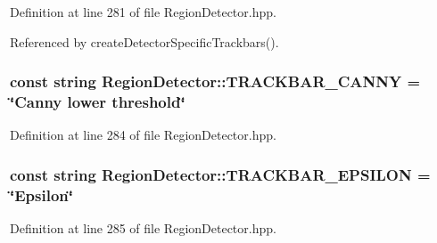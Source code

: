 \-Definition at line 281 of file \-Region\-Detector.\-hpp.



\-Referenced by create\-Detector\-Specific\-Trackbars().

\hypertarget{classmultiscale_1_1analysis_1_1RegionDetector_a8c1c5cde2b7d42ddce44b7f8208f07cc}{
\subsubsection[{\-T\-R\-A\-C\-K\-B\-A\-R\-\_\-\-C\-A\-N\-N\-Y}]{\setlength{\rightskip}{0pt plus 5cm}const string {\bf \-Region\-Detector\-::\-T\-R\-A\-C\-K\-B\-A\-R\-\_\-\-C\-A\-N\-N\-Y} = \char`\"{}\-Canny lower threshold\char`\"{}}}\label{classmultiscale_1_1analysis_1_1RegionDetector_a8c1c5cde2b7d42ddce44b7f8208f07cc}


\-Definition at line 284 of file \-Region\-Detector.\-hpp.

\hypertarget{classmultiscale_1_1analysis_1_1RegionDetector_aa3f0755a58457592ac027b42576bd312}{
\subsubsection[{\-T\-R\-A\-C\-K\-B\-A\-R\-\_\-\-E\-P\-S\-I\-L\-O\-N}]{\setlength{\rightskip}{0pt plus 5cm}const string {\bf \-Region\-Detector\-::\-T\-R\-A\-C\-K\-B\-A\-R\-\_\-\-E\-P\-S\-I\-L\-O\-N} = \char`\"{}\-Epsilon\char`\"{}}}\label{classmultiscale_1_1analysis_1_1RegionDetector_aa3f0755a58457592ac027b42576bd312}


\-Definition at line 285 of file \-Region\-Detector.\-hpp.



